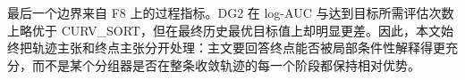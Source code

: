 最后一个边界来自 F8 上的过程指标。DG2 在 log-AUC 与达到目标所需评估次数上略优于 CURV\_SORT，但在最终历史最优目标值上却明显更差。因此，本文始终把轨迹主张和终点主张分开处理：主文要回答终点能否被局部条件性解释得更充分，而不是某个分组器是否在整条收敛轨迹的每一个阶段都保持相对优势。
